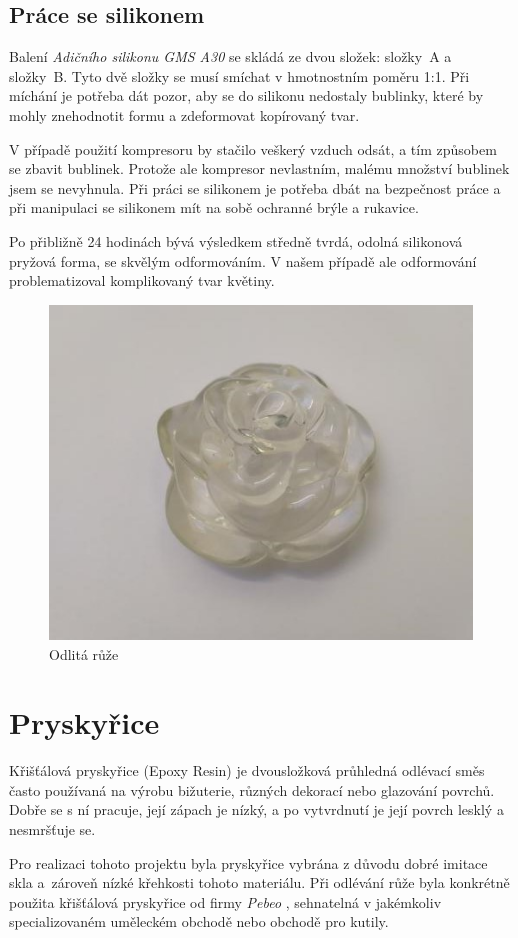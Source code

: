 \subsection*{Práce se silikonem}
Balení \textit{Adičního silikonu GMS A30} se skládá ze dvou složek: složky~A a složky~B. Tyto dvě složky se musí smíchat v hmotnostním poměru 1:1. Při míchání je potřeba dát pozor, aby se do silikonu nedostaly bublinky, které by mohly znehodnotit formu a zdeformovat kopírovaný tvar.

V případě použití kompresoru by stačilo veškerý vzduch odsát, a tím způsobem se zbavit bublinek. Protože ale kompresor nevlastním, malému množství bublinek jsem se nevyhnula. Při práci se silikonem je potřeba dbát na bezpečnost práce a při manipulaci se silikonem mít na sobě ochranné brýle a rukavice.


Po přibližně 24 hodinách bývá výsledkem středně tvrdá, odolná silikonová pryžová forma, se skvělým odformováním. V našem případě ale odformování problematizoval komplikovaný tvar květiny.


\begin{figure}[htbp]
	\centering
	\includegraphics[width=0.5
	\textwidth]{img/05odl/Rose.jpg}
	\caption{Odlitá růže}
\end{figure}

\section{Pryskyřice}
Křišťálová pryskyřice  \cite{pryskyrice} (Epoxy Resin) je dvousložková průhledná odlévací směs často používaná na výrobu bižuterie, různých dekorací nebo glazování povrchů. Dobře se s ní pracuje, její zápach je nízký, a po vytvrdnutí je její povrch lesklý a nesmršťuje se. 

Pro realizaci tohoto projektu byla pryskyřice vybrána z důvodu dobré imitace skla a~zároveň nízké křehkosti tohoto materiálu. 
Při odlévání růže byla konkrétně použita křišťálová pryskyřice od firmy \textit{Pebeo}  \cite{pebeo}, sehnatelná v jakémkoliv specializovaném uměleckém obchodě nebo obchodě pro kutily. 


